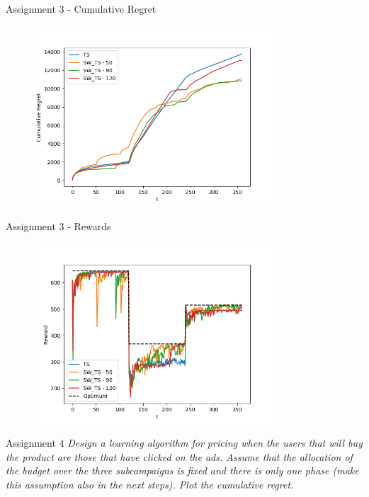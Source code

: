 \documentclass[11pt]{beamer}
\begin{document}
\begin{frame}{Assignment 3 -  Cumulative Regret}
\begin{figure}[hbtp]
\centering
\includegraphics[width=0.8\textwidth]{images/assignment_3_exp_1_cum_regret.png}
\caption{}
\end{figure}
\end{frame}

\begin{frame}{Assignment 3 - Rewards}
\begin{figure}[hbtp]
\centering
\includegraphics[width=0.8\textwidth]{images/assignment_3_exp_1_cum_reward.png}
\caption{}
\end{figure}
\end{frame}

\begin{frame}{Assignment 4}
\textit{Design a learning algorithm for pricing when the users that will buy the product are those that have clicked on the ads. Assume that the allocation of the budget over the three subcampaigns is fixed and there is only one phase (make this assumption also in the next steps). Plot the cumulative regret.}
\end{frame}
\end{document}
